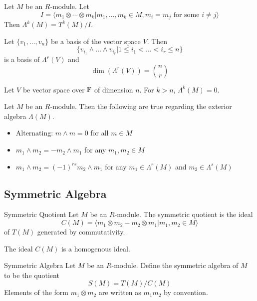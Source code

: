 \documentclass[a4paper]{article}
\begin{document}
\begin{thm}{}{} Let $M$ be an $R$-module. Let $$I=\langle m_1\otimes\cdots\otimes m_k|m_1,\dots,m_k\in M, m_i=m_j\text{ for some }i\neq j\rangle$$ Then $\Lambda^k(M)=T^k(M)/I$. 
\end{thm}

\begin{prp}{}{} Let $\{v_1,\dots,v_n\}$ be a basis of the vector space $V$. Then $$\{v_{i_1}\wedge\dots\wedge v_{i_r}|1\leq i_1<\dots<i_r\leq n\}$$ is a basis of $\Lambda^r(V)$ and $$\dim(\Lambda^r(V))=\binom{n}{r}$$
\end{prp}

\begin{crl}{}{} Let $V$ be vector space over $\mathbb{F}$ of dimension $n$. For $k>n$, $\Lambda^k(M)=0$. 
\end{crl}

\begin{lmm}{}{} Let $M$ be an $R$-module. Then the following are true regarding the exterior algebra $\Lambda(M)$. 
\begin{itemize}
\item Alternating: $m\wedge m=0$ for all $m\in M$
\item $m_1\wedge m_2=-m_2\wedge m_1$ for any $m_1,m_2\in M$
\item $m_1\wedge m_2=(-1)^{rs}m_2\wedge m_1$ for any $m_1\in\Lambda^r(M)$ and $m_2\in\Lambda^s(M)$
\end{itemize}
\end{lmm}

\subsection{Symmetric Algebra}
\begin{defn}{Symmetric Quotient}{} Let $M$ be an $R$-module. The symmetric quotient is the ideal $$C(M)=\langle m_1\otimes m_2-m_2\otimes m_1|m_1,m_2\in M\rangle$$ of $T(M)$ generated by commutativity. 
\end{defn}

\begin{lmm}{}{} The ideal $C(M)$ is a homogenous ideal. 
\end{lmm}

\begin{defn}{Symmetric Algebra}{} Let $M$ be an $R$-module. Define the symmetric algebra of $M$ to be the quotient $$S(M)=T(M)/C(M)$$ Elements of the form $m_1\otimes m_2$ are written as $m_1m_2$ by convention. 
\end{defn}
\end{document}
